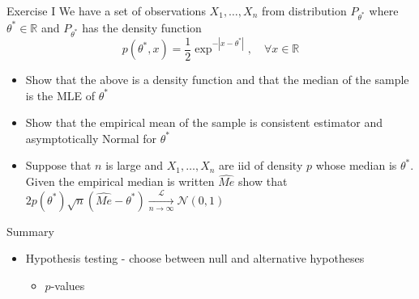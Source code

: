 \documentclass{beamer}
\begin{document}
\begin{frame}{Exercise I} 
We have a set of observations $X_1, \ldots, X_n$ from distribution $P_{\theta^*}$ where $\theta^* \in \mathbb{R}$ and  $P_{\theta^*}$ has the density function 
\begin{displaymath} 
p(\theta^*, x) = \frac{1}{2} \exp^{-|x - \theta^*|}, \quad \forall x \in \mathbb{R} 
\end{displaymath}
\begin{itemize} 
 \item Show that the above is a density function and that the median of the sample is the MLE of $\theta^*$ 
 \item Show that the empirical mean of the sample is consistent estimator and asymptotically Normal for $\theta^*$ 
 \item Suppose that $n$ is large and $X_1, \ldots, X_n$ are iid of density $p$ whose median is $\theta^*$. Given the empirical median is written $\hat{Me}$ show that $2p(\theta^*)\sqrt{n}(\hat{Me} - \theta^*) \xrightarrow[n \rightarrow \infty]{\mathcal{L}} \mathcal{N}(0, 1)$ 
\end{itemize}
\end{frame}

\begin{frame}{Summary}
\begin{itemize} 
 \item Hypothesis testing - choose between null and alternative hypotheses 
  \begin{itemize}
 \item $p$-values 
  \end{itemize}
\end{itemize}
\end{frame}
\end{document}
